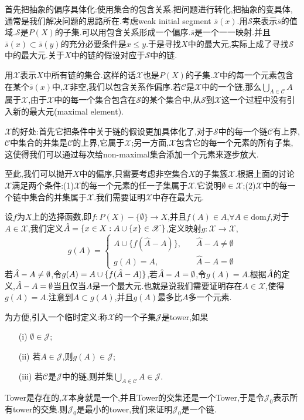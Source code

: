 \documentclass[12pt,a4paper,openany]{book}
\begin{document}
首先把抽象的偏序具体化:使用集合的包含关系.把问题进行转化,把抽象的变具体,通常是我们解决问题的思路所在.考虑weak initial segment $\bar{s}(x)$.用$\mathscr{S}$来表示$\bar{s}$的值域.$\mathscr{S}$是$P(X)$的子集.可以用包含关系形成一个偏序.$\bar{s}$是一个一一映射.并且$\bar{s}(x) \subset \bar{s}(y)$的充分必要条件是$x \le y$.于是寻找$X$中的最大元,实际上成了寻找$\mathscr{S}$中的最大元.关于$X$中的链的假设对应于$\mathscr{S}$中的链.

用$\mathscr{X}$表示$X$中所有链的集合.这样的话$\mathscr{X}$也是$P(X)$的子集.$\mathscr{X}$中的每一个元素包含在某个$\bar{s}(x)$中,$\mathscr{X}$非空,我们以包含关系作偏序.若$\mathscr{C}$是$\mathscr{X}$中的一个链,那么$\bigcup_{A \in \mathscr{C}}{A}$属于$\mathscr{X}$,由于$\mathscr{X}$中的每一个集合包含在$\mathscr{S}$的某个集合中,从$\mathscr{S}$到$\mathscr{X}$这一个过程中没有引入新的最大元(maximal element).

$\mathscr{X}$的好处:首先它把条件中关于链的假设更加具体化了,对于$\mathscr{S}$中的每一个链$\mathscr{C}$有上界,$\mathscr{C}$中集合的并集是$\mathscr{C}$的上界,它属于$\mathscr{X}$;另一方面,$\mathscr{X}$包含它的每一个元素的所有子集,这使得我们可以通过每次给non-maximal集合添加一个元素来逐步放大.

至此,我们可以抛开$X$中的偏序,只需要考虑非空集合$X$的子集簇$\mathscr{X}$.根据上面的讨论$\mathscr{X}$满足两个条件:(1)$\mathscr{X}$的每一个元素的任一子集属于$\mathscr{X}$.它说明$\emptyset \in \mathscr{X}$;(2)$\mathscr{X}$中的每一个链中集合的并集属于$\mathscr{X}$.我们需要证明$\mathscr{X}$中存在最大元.

设$f$为$X$上的选择函数,即$f:P(X)-\{\emptyset\}\to X$,并且$f(A) \in A$,$\forall A \in \text{dom}f$,对于$A \in \mathscr{X}$,我们定义$\Hat{A}=\{x \in X: A \cup \{x\} \in \mathscr{X}\}$,定义映射$g:\mathscr{X}\to\mathscr{X}$,
\[
g(A)=\begin{cases}
A \cup \{f(\hat{A}-A)\},&\quad\hat{A}-A\neq\emptyset\\
g(A)=A,&\quad\hat{A}-A=\emptyset
\end{cases}
\]
若$\Hat{A}-A\neq\emptyset$,令$g(A)=A \cup \{f(\Hat{A}-A)\}$,若$\Hat{A}-A=\emptyset$,令$g(A)=A$.根据$\Hat{A}$的定义,$\Hat{A}-A=\emptyset$当且仅当$A$是一个最大元.也就是说我们需要证明存在$A \in \mathscr{X}$,使得$g(A)=A$.注意到$A \subset g(A)$,并且$g(A)$最多比$A$多一个元素.

为方便,引入一个临时定义:称$\mathscr{X}$的一个子集$\mathscr{J}$是tower,如果
\begin{enumerate}
\item[(i)]$\emptyset \in \mathscr{J}$;
\item[(ii)]若$A \in \mathscr{J}$,则$g(A) \in \mathscr{J}$;
\item[(iii)]若$\mathscr{C}$是$\mathscr{J}$中的链,则并集$\bigcup_{A \in \mathscr{C}}{A} \in \mathscr{J}$.
\end{enumerate}
Tower是存在的,$\mathscr{X}$本身就是一个,并且Tower的交集还是一个Tower,于是令$\mathscr{J}_0$表示所有tower的交集.则$\mathscr{J}_0$是最小的tower,我们来证明$\mathscr{J}_0$是一个链.
\end{document}
